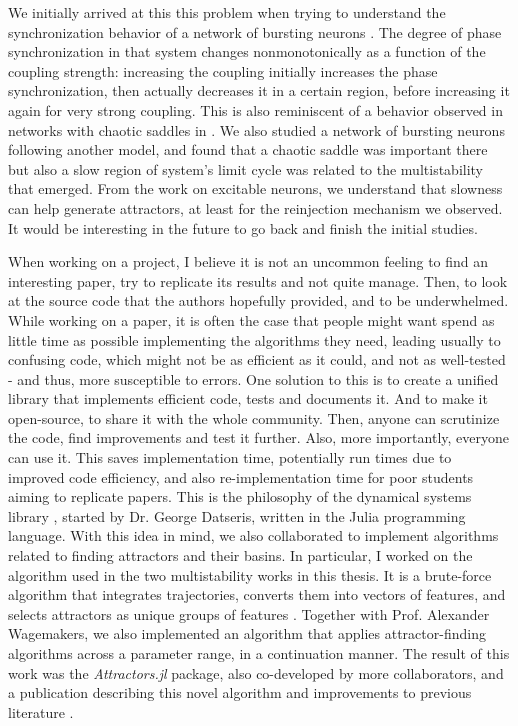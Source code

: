 We initially arrived at this this problem when trying to understand the synchronization behavior of a network of bursting neurons \cite{rossi2021phase}. The degree of phase synchronization in that system changes nonmonotonically as a function of the coupling strength: increasing the coupling initially increases the phase synchronization, then actually decreases it in a certain region, before increasing it again for very strong coupling. This is also reminiscent of a behavior observed in networks with chaotic saddles in . We also studied a network of bursting neurons following another model, and found that a chaotic saddle was important there but also a slow region of system's limit cycle was related to the multistability that emerged. From the work on excitable neurons, we understand that slowness can help generate attractors, at least for the reinjection mechanism we observed. It would be interesting in the future to go back and finish the initial studies. 

When working on a project, I believe it is not an uncommon feeling to find an interesting paper, try to replicate its results and not quite manage. Then, to look at the source code that the authors hopefully provided, and to be underwhelmed. While working on a paper, it is often the case that people might want spend as little time as possible implementing the algorithms they need, leading usually to confusing code, which might not be as efficient as it could, and not as well-tested - and thus, more susceptible to errors. 
One solution to this is to create a unified library that implements efficient code, tests and documents it. And to make it open-source, to share it with the whole community. Then, anyone can scrutinize the code, find improvements and test it further. Also, more importantly, everyone can use it. This saves implementation time, potentially run times due to improved code efficiency, and also re-implementation time for poor students aiming to replicate papers. This is the philosophy of the dynamical systems library \cite{datseris2018dynamical}, started by Dr. George Datseris, written in the Julia programming language. With this idea in mind, we also collaborated to implement algorithms related to finding attractors and their basins. In particular, I worked on the algorithm used in the two multistability works in this thesis. It is a brute-force algorithm that integrates trajectories, converts them into vectors of features, and selects attractors as unique groups of features \cite{gelbrecht2020monte, stender2021bstab, datseris2023framework}. Together with Prof. Alexander Wagemakers, we also implemented an algorithm that applies attractor-finding algorithms across a parameter range, in a continuation manner. The result of this work was the \textit{Attractors.jl} package, also co-developed by more collaborators, and a publication describing this novel algorithm and improvements to previous literature \cite{datseris2023framework}.


